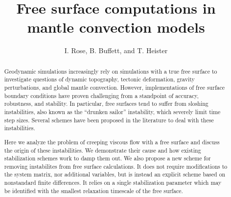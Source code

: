 \documentclass[preprint,12pt,authoryear]{elsarticle}
\begin{document}
\begin{frontmatter}



\title{Free surface computations in mantle convection models}


\author{I. Rose, B. Buffett, and T. Heister}

\address{}

\begin{abstract}
Geodynamic simulations increasingly rely on simulations with a true free surface to 
investigate questions of dynamic topography, tectonic deformation, gravity perturbations, and
global mantle convection. However, implementations of free surface boundary conditions 
have proven challenging from a standpoint of accuracy, robustness, and stability.
In particular, free surfaces tend to suffer from sloshing instabilities, also known as 
the ``drunken sailor'' instability, which severely limit time step sizes. Several 
schemes have been proposed in the literature to deal with these instabilities.

Here we analyze the problem of creeping viscous flow with a free surface and discuss the 
origin of these instabilities. We demonstrate their cause and how existing stabilization 
schemes work to damp them out.
We also propose a new scheme for removing instabilites from free surface calculations. 
It does not require modifications to the system matrix, nor additional variables, but is instead
an explicit scheme based on nonstandard finite differences.  It relies on a single 
stabilization parameter which may be identified with the smallest relaxation timescale of the
free surface.


\end{abstract}
\end{frontmatter}
\end{document}
